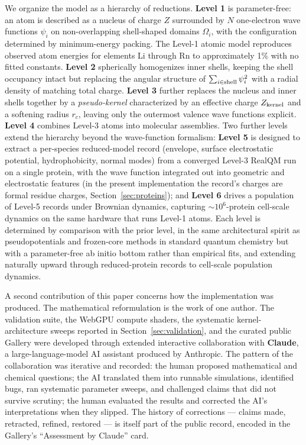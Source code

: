 \documentclass[11pt]{article}
\begin{document}
We organize the model as a hierarchy of reductions. \textbf{Level 1} is parameter-free: an atom is described as a nucleus of charge $Z$ surrounded by $N$ one-electron wave functions $\psi_i$ on non-overlapping shell-shaped domains $\Omega_i$, with the configuration determined by minimum-energy packing. The Level-1 atomic model reproduces observed atom energies for elements Li through Rn to approximately 1\% with no fitted constants. \textbf{Level 2} spherically homogenizes inner shells, keeping the shell occupancy intact but replacing the angular structure of $\sum_{i \in {\rm shell}} \psi_i^2$ with a radial density of matching total charge. \textbf{Level 3} further replaces the nucleus and inner shells together by a \emph{pseudo-kernel} characterized by an effective charge $Z_{\rm kernel}$ and a softening radius $r_c$, leaving only the outermost valence wave functions explicit. \textbf{Level 4} combines Level-3 atoms into molecular assemblies. Two further levels extend the hierarchy beyond the wave-function formalism: \textbf{Level 5} is designed to extract a per-species reduced-model record (envelope, surface electrostatic potential, hydrophobicity, normal modes) from a converged Level-3 RealQM run on a single protein, with the wave function integrated out into geometric and electrostatic features (in the present implementation the record's charges are formal residue charges, Section~\ref{sec:proteins}); and \textbf{Level 6} drives a population of Level-5 records under Brownian dynamics, capturing $\sim 10^6$-protein cell-scale dynamics on the same hardware that runs Level-1 atoms. Each level is determined by comparison with the prior level, in the same architectural spirit as pseudopotentials and frozen-core methods in standard quantum chemistry but with a parameter-free ab initio bottom rather than empirical fits, and extending naturally upward through reduced-protein records to cell-scale population dynamics.

A second contribution of this paper concerns how the implementation was produced. The mathematical reformulation is the work of one author. The validation suite, the WebGPU compute shaders, the systematic kernel-architecture sweeps reported in Section~\ref{sec:validation}, and the curated public Gallery were developed through extended interactive collaboration with \textbf{Claude}, a large-language-model AI assistant produced by Anthropic. The pattern of the collaboration was iterative and recorded: the human proposed mathematical and chemical questions; the AI translated them into runnable simulations, identified bugs, ran systematic parameter sweeps, and challenged claims that did not survive scrutiny; the human evaluated the results and corrected the AI's interpretations when they slipped. The history of corrections --- claims made, retracted, refined, restored --- is itself part of the public record, encoded in the Gallery's ``Assessment by Claude'' card.
\end{document}
